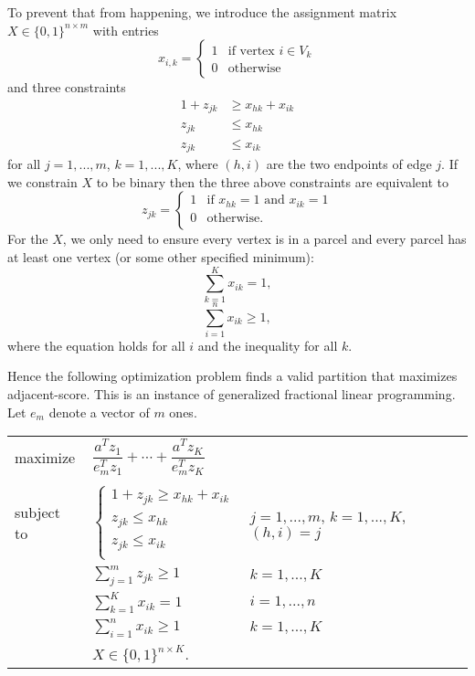 To prevent that from happening, we introduce the assignment matrix
$X \in \{0, 1\}^{n \times m}$ with entries
\[ x_{i,k} = \begin{cases}
  1 & \text{if vertex } i \in V_k \\
  0 & \text{otherwise}
\end{cases} \]
and three constraints
\begin{align*}
1 + z_{jk} &\geq x_{hk} + x_{ik} \\
z_{jk} &\leq x_{hk} \\
z_{jk} &\leq x_{ik}
\end{align*}
for all $j = 1, ..., m$, $k = 1, ..., K$, where $(h,i)$ are the two
endpoints of edge $j$. If we constrain $X$ to be binary then the three
above constraints are equivalent to
\[ z_{jk} = \begin{cases}
  1 & \text{if } x_{hk} = 1 \text{ and } x_{ik} = 1 \\
  0 & \text{otherwise}. \\
\end{cases}\]
For the $X$, we only need to ensure every vertex is in a parcel and every
parcel has at least one vertex (or some other specified minimum):
\[ \sum_{k=1}^K x_{ik} = 1, \]
\[ \sum_{i=1}^n x_{ik} \geq 1, \]
where the equation holds for all $i$ and the inequality for all $k$.

Hence the following optimization problem finds a valid partition that
maximizes adjacent-score. This is an instance of generalized fractional
linear programming. Let $e_m$ denote a vector of $m$ ones.

\begin{center}
\bgroup
\def\arraystretch{1.5}
\begin{tabular}{l l l}
maximize   & $\dfrac{a^T z_1}{e_m^T z_1} + \cdots +
              \dfrac{a^T z_K}{e_m^T z_K}$ \\ \\
subject to 
           & $\begin{cases}
                 1 + z_{jk} \geq x_{hk} + x_{ik} \\
                 z_{jk} \leq x_{hk}             \\
                 z_{jk} \leq x_{ik}             \\
             \end{cases}$
           & $j = 1, ..., m$, $k = 1, ..., K$, $(h,i) = j$ \\
           & $\sum_{j=1}^m z_{jk} \geq 1$ & $k = 1, ..., K$ \\
           & $\sum_{k=1}^K x_{ik} = 1$ & $i = 1, ..., n$ \\
           & $\sum_{i=1}^n x_{ik} \geq 1$ & $k = 1, ..., K$ \\
           & $X \in \{0, 1\}^{n \times K}$.
\end{tabular}
\egroup
\end{center}

